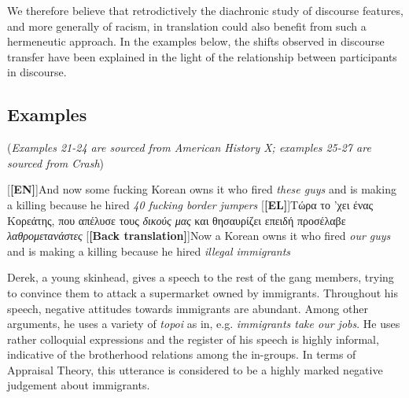 \documentclass[output=paper]{LSP/langsci}
\begin{document}
We therefore believe that retrodictively \citep{Wright1971,Chesterman2008} the diachronic study of discourse features, and more generally of racism, in translation could also benefit from such a hermeneutic approach. In the examples below, the shifts observed in discourse transfer have been explained in the light of the relationship between participants in discourse.

\subsection{Examples} \label{sec:2:5:1} 
(\textit{Examples 21-24 are sourced from American History X; examples 25-27 are sourced from Crash})

\ea \label{ex:2:21}
\begin{xlist}
\exi{}[\textbf{[EN]}]{And now some fucking Korean owns it who fired \emph{these guys} and is making a killing because he hired \emph{40 fucking border jumpers}}
\exi{}[\textbf{[EL]}]{Τώρα το 'χει ένας Κορεάτης, που απέλυσε τους \emph{δικούς μας} και θησαυρίζει επειδή προσέλαβε \emph{λαθρομετανάστες}}
\exi{}[\textbf{[Back translation]}]{Now a Korean owns it who fired \emph{our guys }and is making a killing because he hired \emph{illegal immigrants}}
\end{xlist}
\z

Derek, a young skinhead, gives a speech to the rest of the gang members, trying to convince them to attack a supermarket owned by immigrants. Throughout his speech, negative attitudes towards immigrants are abundant. Among other arguments, he uses a variety of \textit{topoi} as in, e.g. \textit{immigrants take our jobs}. He uses rather colloquial expressions and the register of his speech is highly informal, indicative of the brotherhood relations among the in-groups. In terms of Appraisal Theory, this utterance is considered to be a highly marked negative judgement about immigrants.
\end{document}
